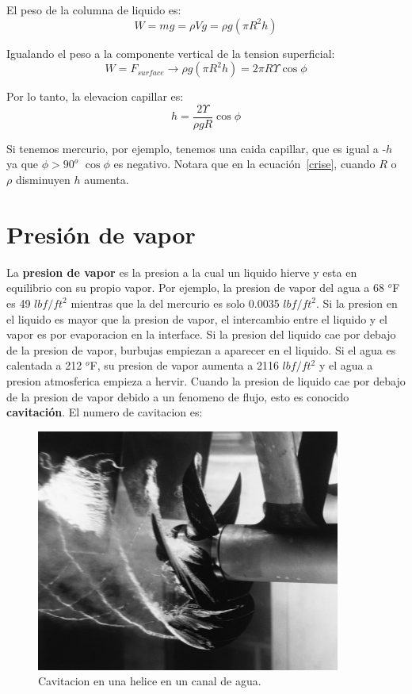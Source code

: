 \documentclass[10pt, oneside]{article}
\begin{document}
El peso de la columna de liquido es:
$$
W = mg = \rho V g = \rho g (\pi R^2 h)
$$

Igualando el peso a la componente vertical de la tension superficial:
$$
W=F_{surface} \rightarrow \rho g (\pi R^2 h) = 2\pi R \Upsilon \cos \phi
$$

Por lo tanto, la elevacion capillar es:
\begin{equation}
h=\frac{2 \Upsilon}{\rho g R} \cos \phi
\label{crise}
\end{equation}

 Si tenemos mercurio, por ejemplo, tenemos una caida capillar, que es igual a -$h$ ya que  $\phi > 90^o$ $\cos \phi$ es negativo. Notara que en la ecuaci\'on~\ref{crise}, cuando $R$ o $\rho$ disminuyen $h$ aumenta.  

\section{Presi\'on de vapor}
La \textbf{presion de vapor} es la presion a la cual un liquido hierve y esta en equilibrio con su propio vapor. Por ejemplo, la presion de vapor del agua a 68 $^o$F es 49 $lbf/ft^2$ mientras que la del mercurio es solo 0.0035 $lbf/ft^2$. Si la presion en el liquido es mayor que la presion de vapor, el intercambio entre el liquido y el vapor es por evaporacion en la interface. Si la presion del liquido cae por debajo de la presion de vapor, burbujas empiezan a aparecer en el liquido. Si el agua es calentada a 212 $^o$F, su presion de vapor aumenta a 2116 $lbf/ft^2$ y el agua a presion atmosferica empieza a hervir. Cuando la presion de liquido cae por debajo de la presion de vapor debido a un fenomeno de flujo, esto es conocido \textbf{cavitaci\'on}. El numero de cavitacion es:

\begin{figure}[h]
\centering
\includegraphics[width=10cm]{Cavitating-prop}
\caption{Cavitacion en una helice en un canal de agua.}
\label{cavi}
\end{figure}
\end{document}
